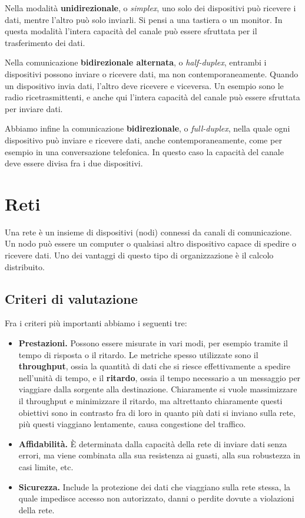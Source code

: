         Nella modalità \textbf{unidirezionale}, o \textit{simplex}, uno solo dei dispositivi può ricevere i dati, mentre l'altro può solo inviarli. Si pensi a una tastiera o un monitor. In questa modalità l'intera capacità del canale può essere sfruttata per il trasferimento dei dati.
        
        Nella comunicazione \textbf{bidirezionale alternata}, o \textit{half-duplex}, entrambi i dispositivi possono inviare o ricevere dati, ma non contemporaneamente. Quando un dispositivo invia dati, l'altro deve ricevere e viceversa. Un esempio sono le radio ricetrasmittenti, e anche qui l'intera capacità del canale può essere sfruttata per inviare dati.
        
        Abbiamo infine la comunicazione \textbf{bidirezionale}, o \textit{full-duplex}, nella quale ogni dispositivo può inviare e ricevere dati, anche contemporaneamente, come per esempio in una conversazione telefonica. In questo caso la capacità del canale deve essere divisa fra i due dispositivi.
        
\section{Reti}
    Una rete è un insieme di dispositivi (nodi) connessi da canali di comunicazione. Un nodo può essere un computer o qualsiasi altro dispositivo capace di spedire o ricevere dati. Uno dei vantaggi di questo tipo di organizzazione è il calcolo distribuito.
    
    \subsection{Criteri di valutazione}
        Fra i criteri più importanti abbiamo i seguenti tre:
        \begin{itemize}
            \item \textbf{Prestazioni.} Possono essere misurate in vari modi, per esempio tramite il tempo di risposta o il ritardo.
            Le metriche spesso utilizzate sono il \textbf{throughput}, ossia la quantità di dati che si riesce effettivamente a spedire nell'unità di tempo, e il \textbf{ritardo}, ossia il tempo necessario a un messaggio per viaggiare dalla sorgente alla destinazione. Chiaramente si vuole massimizzare il throughput e minimizzare il ritardo, ma altrettanto chiaramente questi obiettivi sono in contrasto fra di loro in quanto più dati si inviano sulla rete, più questi viaggiano lentamente, causa congestione del traffico.
            
            \item \textbf{Affidabilità.} È determinata dalla capacità della rete di inviare dati senza errori, ma viene combinata alla sua resistenza ai guasti, alla sua robustezza in casi limite, etc.
            
            \item \textbf{Sicurezza.} Include la protezione dei dati che viaggiano sulla rete stessa, la quale impedisce accesso non autorizzato, danni o perdite dovute a violazioni della rete.
        \end{itemize}
        
